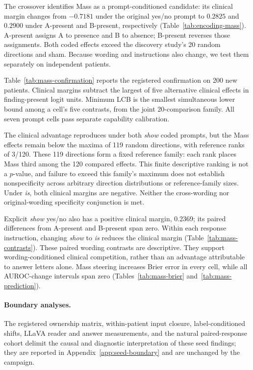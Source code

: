 The crossover identifies Mass as a prompt-conditioned candidate: its clinical margin changes from $-0.7181$ under the original yes/no prompt to $0.2825$ and $0.2900$ under A-present and B-present, respectively (Table~\ref{tab:encoding-mass}). A-present assigns A to presence and B to absence; B-present reverses those assignments. Both coded effects exceed the discovery study's 20 random directions and sham. Because wording and instructions also change, we test them separately on independent patients.

Table~\ref{tab:mass-confirmation} reports the registered confirmation on 200 new patients. Clinical margins subtract the largest of five alternative clinical effects in finding-present logit units. Minimum LCB is the smallest simultaneous lower bound among a cell's five contrasts, from the joint 20-comparison family. All seven prompt cells pass separate capability calibration.



The clinical advantage reproduces under both \textit{show} coded prompts, but the Mass effects remain below the maxima of 119 random directions, with reference ranks of 3/120. These 119 directions form a fixed reference family: each rank places Mass third among the 120 compared effects. This finite descriptive ranking is not a $p$-value, and failure to exceed this family's maximum does not establish nonspecificity across arbitrary direction distributions or reference-family sizes. Under \textit{is}, both clinical margins are negative. Neither the cross-wording nor original-wording specificity conjunction is met.

Explicit \textit{show} yes/no also has a positive clinical margin, 0.2369; its paired differences from A-present and B-present span zero. Within each response instruction, changing \textit{show} to \textit{is} reduces the clinical margin (Table~\ref{tab:mass-contrasts}). These paired wording contrasts are descriptive. They support wording-conditioned clinical competition, rather than an advantage attributable to answer letters alone. Mass steering increases Brier error in every cell, while all AUROC-change intervals span zero (Tables~\ref{tab:mass-brier} and~\ref{tab:mass-prediction}).

\paragraph{Boundary analyses.}
The registered ownership matrix, within-patient input closure, label-conditioned shifts, LLaVA reader and answer measurements, and the natural paired-response cohort delimit the causal and diagnostic interpretation of these seed findings; they are reported in Appendix~\ref{app:seed-boundary} and are unchanged by the campaign.

\FloatBarrier
